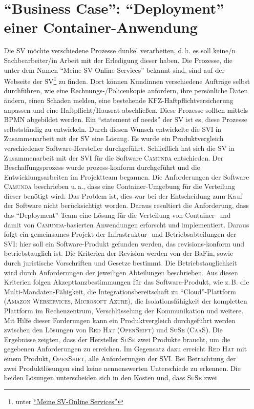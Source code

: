 \section{\enquote{Business Case}: \enquote{Deployment} einer Container-Anwendung}
Die \ac{SV} möchte verschiedene Prozesse dunkel verarbeiten, d.\,h. es soll keine/n Sachbearbeiter/in Arbeit mit der Erledigung dieser haben. Die Prozesse, die unter dem Namen \enquote{Meine \ac{SV}-Online Services} bekannt sind, sind auf der Webseite der \ac{SV}\footnote{unter \href{https://www.sparkassenversicherung.de/content/privatkunden/service/daten/index.html}{\enquote{Meine \ac{SV}-Online Services}}} zu finden. Dort können Kundinnen verschiedene Aufträge selbst durchführen, wie eine Rechnungs-/Policenkopie anfordern, ihre persönliche Daten ändern, einen Schaden melden, eine bestehende KFZ-Haftpflichtversicherung anpassen und eine Haftpflicht/Hausrat abschließen. Diese Prozesse sollten mittels \ac{BPMN} abgebildet werden. Ein \enquote{statement of needs} der \ac{SV} ist es, diese Prozesse selbstständig zu entwickeln. Durch diesen Wunsch entwickelte die \ac{SVI} in Zusammenarbeit mit der \ac{SV} eine Lösung. Es wurde ein Produktvergleich verschiedener Software-Hersteller durchgeführt. Schließlich hat sich die \ac{SV} in Zusammenarbeit mit der \ac{SVI} für die Software \textsc{Camunda} entschieden. Der Beschaffungsprozess wurde prozess-konform durchgeführt und die Entwicklungsarbeiten im Projektteam begannen. Die Anforderungen der Software \textsc{Camunda} beschrieben u.\,a., dass eine Container-Umgebung für die Verteilung dieser benötigt wird. Das Problem ist, dies war bei der Entscheidung zum Kauf der Software nicht berücksichtigt worden. Daraus resultiert die Anforderung, dass das \enquote{Deployment}-Team eine Lösung für die Verteilung von Container- und damit von \textsc{Camunda}-basierten Anwendungen erforscht und implementiert. Daraus folgt ein gemeinsames Projekt der Infrastruktur- und Betriebsabteilungen der \ac{SVI}: hier soll ein Software-Produkt gefunden werden, das revisions-konform und betriebstauglich ist. Die Kriterien der Revision werden von der \ac{BaFin}, sowie durch juristische Vorschriften und Gesetze bestimmt. Die Betriebstauglichkeit wird durch Anforderungen der jeweiligen Abteilungen beschrieben. Aus diesen Kriterien folgen Akzepttanzbestimmungen für das Software-Produkt, wie z.\,B. die Multi-Mandaten-Fähigkeit, die Integrationsbereitschaft zu \enquote{Cloud}-Plattform (\textsc{Amazon Webservices}, \textsc{Microsoft Azure}), die Isolationsfähigkeit der kompletten Plattform im Rechenzentrum, Verschlüsselung der Kommunikation und weitere. Mit Hilfe dieser Forderungen kann ein Produktvergleich durchgeführt werden zwischen den Lösungen von \textsc{Red Hat} (\textsc{OpenShift}) und \textsc{SuSe} (\textsc{CaaS}). Die Ergebnisse zeigten, dass der Hersteller \textsc{SuSe} zwei Produkte braucht, um die gegebenen Anforderungen zu erreichen. Im Gegensatz dazu erreicht \textsc{Red Hat} mit einem Produkt, \textsc{OpenShift}, alle Anforderungen der \ac{SVI}. Bei Betrachtung der zwei Produktlösungen sind keine nennenswerten Unterschiede zu erkennen. Die beiden Lösungen unterscheiden sich in den Kosten und, dass \textsc{SuSe} zwei 